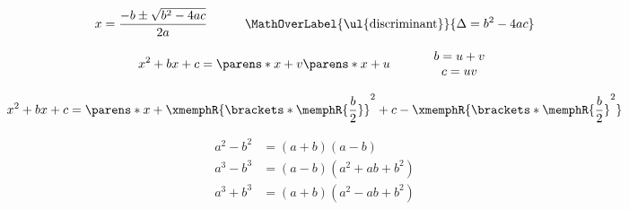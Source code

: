 \begin{multicols}{2}
\begin{CheatsheetEntryFrame}
    \end{CheatsheetEntryFrame}

    \begin{CheatsheetEntryFrame}

        \begin{gather*}
            x = \frac{-b \pm \sqrt{b^2 - 4ac}}{2a}
            \qquad\quad
            \MathOverLabel{\text{\ul{discriminant}}}{\Delta = b^2 - 4ac}
        \end{gather*}

        \begin{equation*}
            x^2 + bx + c = \parens*{x+v} \parens*{x+u}
            \qquad\quad
                \begin{array}{c}
                    b = u+v \\
                    c = uv
                \end{array}
        \end{equation*}
        \vspace{-2ex} %

        \begin{equation*}
            x^2 + b x + c
            = \parens*{x + \xmemphR{\brackets*{\memphR{\frac{b}{2}}}}}^2
            + c
            - \xmemphR{\brackets*{\memphR{\frac{b}{2}}}^2}
        \end{equation*}

    \end{CheatsheetEntryFrame}

    \begin{CheatsheetEntryFrame}

        \begin{align*}
            a^2 - b^2 &= (a + b) (a - b) \\
            a^3 - b^3 &= (a - b) (a^2 + ab + b^2) \\
            a^3 + b^3 &= (a + b) (a^2 - ab + b^2)
        \end{align*}

    \end{CheatsheetEntryFrame}

\end{multicols}
\newpage


